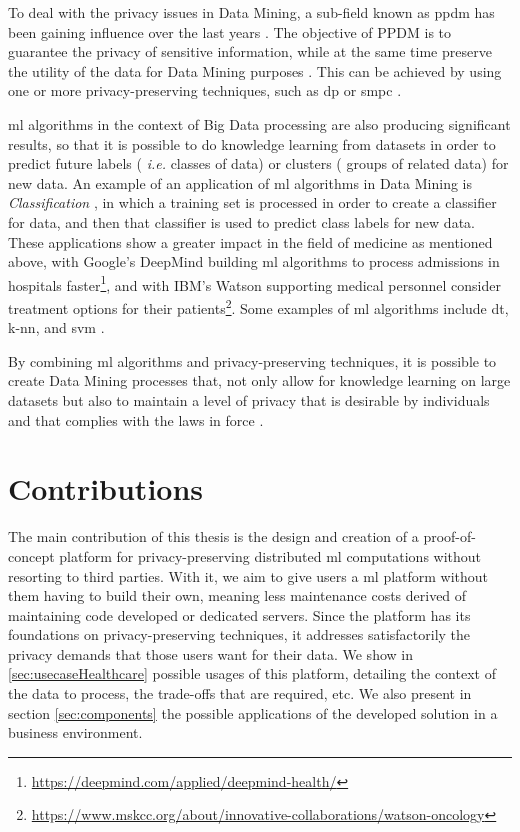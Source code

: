 To deal with the privacy issues in Data Mining, a sub-field known as \ac{ppdm} has been gaining influence over the last years \cite{DAcquisto2015}. The objective of PPDM is to guarantee the privacy of sensitive information, while at the same time preserve the utility of the data for Data Mining purposes \cite{agrawal2000privacy}.
This can be achieved by using one or more privacy-preserving techniques, such as \ac{dp} \cite{Danezis2015} or \ac{smpc} \cite{DAcquisto2015}.


\ac{ml} algorithms in the context of Big Data processing are also producing significant results, so that it is possible to do knowledge learning from datasets in order to predict future labels ( \textit{i.e.} classes of data) or clusters ( groups of related data) for new data. An example of an application of \ac{ml} algorithms in Data Mining is \textit{Classification} \cite{LeiXu2014}, in which a training set is processed in order to create a classifier for data, and then that classifier is used to predict class labels for new data. These applications show a greater impact in the field of medicine as mentioned above, with Google's DeepMind building \ac{ml} algorithms to process admissions in hospitals faster\footnote{\url{https://deepmind.com/applied/deepmind-health/}}, and with IBM's Watson supporting medical personnel consider treatment options for their patients\footnote{\url{https://www.mskcc.org/about/innovative-collaborations/watson-oncology}}.
Some examples of \ac{ml} algorithms include \ac{dt}, \ac{k-nn}, and \ac{svm} \cite{LeiXu2014}.

By combining \ac{ml} algorithms and privacy-preserving techniques, it is possible to create Data Mining processes that, not only allow for knowledge learning on large datasets but also to maintain a level of privacy that is desirable by individuals and that complies with the laws in force \cite{DAcquisto2015}.



\section{Contributions}
\label{sec:Intro_Contributions}

The main contribution of this thesis is the design and creation of a proof-of-concept platform for privacy-preserving distributed \ac{ml} computations without resorting to third parties. With it, we aim to give users a \ac{ml} platform without them having to build their own, meaning less maintenance costs derived of maintaining code developed or dedicated servers. Since the platform has its foundations on privacy-preserving techniques, it addresses satisfactorily the privacy demands that those users want for their data.
We show in \ref{sec:usecaseHealthcare} possible usages of this platform, detailing the context of the data to process, the trade-offs that are required, etc. We also present in section \ref{sec:components} the possible applications of the developed solution in a business environment.

